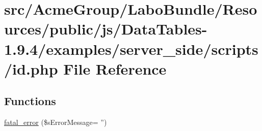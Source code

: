 \hypertarget{id_8php}{\section{src/\+Acme\+Group/\+Labo\+Bundle/\+Resources/public/js/\+Data\+Tables-\/1.9.4/examples/server\+\_\+side/scripts/id.php File Reference}
\label{id_8php}
}
\subsection*{Functions}
\begin{DoxyCompactItemize}
\item 
\hyperlink{id_8php_a1bb235f2e57f0389e14b11592d32119a}{fatal\+\_\+error} (\$s\+Error\+Message= '')
\end{DoxyCompactItemize}
